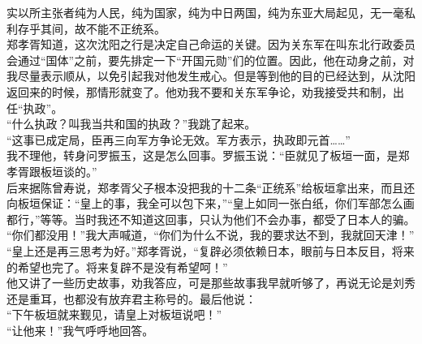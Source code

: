 实以所主张者纯为人民，纯为国家，纯为中日两国，纯为东亚大局起见，无一毫私利存乎其间，故不能不正统系。\\

郑孝胥知道，这次沈阳之行是决定自己命运的关键。因为关东军在叫东北行政委员会通过“国体”之前，要先排定一下“开国元勋”们的位置。因此，他在动身之前，对我尽量表示顺从，以免引起我对他发生戒心。但是等到他的目的已经达到，从沈阳返回来的时候，那情形就变了。他劝我不要和关东军争论，劝我接受共和制，出任“执政”。\\

“什么执政？叫我当共和国的执政？”我跳了起来。\\

“这事已成定局，臣再三向军方争论无效。军方表示，执政即元首……”\\

我不理他，转身问罗振玉，这是怎么回事。罗振玉说：“臣就见了板垣一面，是郑孝胥跟板垣谈的。”\\

后来据陈曾寿说，郑孝胥父子根本没把我的十二条“正统系”给板垣拿出来，而且还向板垣保证：“皇上的事，我全可以包下来，”“皇上如同一张白纸，你们军部怎么画都行，”等等。当时我还不知道这回事，只认为他们不会办事，都受了日本人的骗。\\

“你们都没用！”我大声喊道，“你们为什么不说，我的要求达不到，我就回天津！”\\

“皇上还是再三思考为好。”郑孝胥说，“复辟必须依赖日本，眼前与日本反目，将来的希望也完了。将来复辟不是没有希望呵！”\\

他又讲了一些历史故事，劝我答应，可是那些故事我早就听够了，再说无论是刘秀还是重耳，也都没有放弃君主称号的。最后他说：\\

“下午板垣就来觐见，请皇上对板垣说吧！”\\

“让他来！”我气呼呼地回答。\\